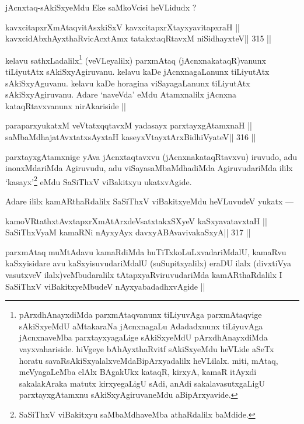 \begin{artha}
jAcnxtaq-sAkiSxyeMdu Eke saMkoVcisi heVLidudx ?
\end{artha}

\begin{shl}
kavxcitapxrXmAtaqvitAsxkiSxV kavxcitapxrXtayxyavitapxraH ||
kavxcidAbxhAyxthaRvicAcx\s\s tAmx tatakxtaqRtavxM niSidhayxteV\hfill || 315 ||
\end{shl}

\begin{artha}
kelavu sathxLadalilx\footnote[2]{pArxdhAnayxdiMda parxmAtaqvanunx 
tiLiyuvAga parxmAtaqvige sAkiSxyeMdU aMtakaraNa jAcnxnagaLu Adadadxnunx 
tiLiyuvAga jAcnxnaveMba parxtayxyagaLige sAkiSxyeMdU pArxdhAnayxdiMda 
vayxvahariside. hiVgeye bAhAyxthaRvitf sAkiSxyeMdu heVLide aSeTx horatu 
savaRsAkiSxyalalxveMdaBipArxyadalilx heVLilalx. miti, mAtaq, meVyagaLeMba elAlx BAgakUkx kataqR, kirxyA, kamaR itAyxdi sakalakAraka matutx kirxyegaLigU sAdi, anAdi sakalavasutxgaLigU parxtayxgAtamxnu sAkiSxyAgiruvaneMdu aBipArxyavide.} (veVLeyalilx) parxmAtaq (jAcnxnakataqR)vanunx tiLiyutAtx sAkiSxyAgiruvanu. kelavu kaDe jAcnxnagaLanunx tiLiyutAtx sAkiSxyAguvanu. kelavu kaDe horagina viSayagaLanunx tiLiyutAtx sAkiSxyAgiruvanu. Adare `naveVda' eMdu Atamxnalilx jAcnxna kataqRtavxvanunx nirAkariside ||
\end{artha}

\begin{shl}
paraparxyukatxM veVtatxqqtavxM yadasayx parxtayxgAtamxnaH ||
saMbaMdhajatAvxtatxsAyxtaH kaseyxVtayxtArxBidhiVyateV\hfill || 316 ||
\end{shl}

\begin{artha}
parxtayxgAtamxnige yAva jAcnxtaqtavxvu (jAcnxnakataqRtavxvu) iruvudo, 
adu inonxMdariMda Agiruvudu, adu viSayasaMbaMdhadiMda AgiruvudariMda ililx `kasayx'\footnote[3]{SaSiThxV viBakitxyu saMbaMdhaveMba athaRdalilx baMdide.} eMdu SaSiThxV viBakitxyu ukatxvAgide.
\end{artha}

\begin{artha}
Adare ililx kamARthaRdalilx SaSiThxV viBakitxyeMdu heVLuvudeV yukatx ---
\end{artha}

\begin{shl}
kamoVRtathxtAvxtapxrXmAtArxdeVsatxtakxSXyeV kaSxyavatavxtaH ||
SaSiThxVyaM kamaRNi nAyxyAyx davxyABAvavivakaSxyA\hfill || 317 ||
\end{shl}

\begin{artha}
parxmAtaq muMtAdavu kamaRdiMda huTiTxkoLuLxvadariMdalU, kamaRvu 
kaSxyisidare avu kaSxyisuvudariMdalU (suSupitxyalilx) eraDU ilalx 
(divxtiVya vasutxveV ilalx)veMbudaralilx tAtapxyaRviruvudariMda 
kamARthaRdalilx I SaSiThxV viBakitxyeMbudeV nAyxyabadadhxvAgide ||
\end{artha}

